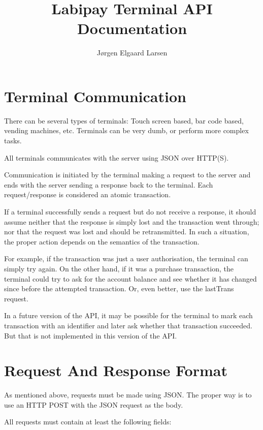 \documentclass[a4paper,11pt]{article}
\title{Labipay Terminal API Documentation}
\author{Jørgen Elgaard Larsen}
\newcommand{\code}[1]
   {\textsf{#1}}
\begin{document}
\maketitle

\section{Terminal Communication}
There can be several types of terminals: Touch screen based, bar code based,
vending machines, etc. Terminals can be very dumb, or perform more complex tasks. 

All terminals communicates with the server using JSON over HTTP(S). 

Communication is initiated by the terminal making a request to the
server and ends with the server sending a response back to the terminal. Each
request/response is considered an atomic transaction.

If a terminal successfully sends a request but do not receive a response, it
should assume neither that the response is simply lost and the transaction
went through; nor that the request was lost and should be
retransmitted. In such a situation, the proper action depends on the semantics
of the transaction.

For example, if the transaction was just a user authorisation, the terminal
can simply try again. On the other hand, if it was a purchase transaction, the
terminal could try to ask for the account balance and see whether it has
changed since before the attempted transaction. Or, even better, use
the \code{lastTrans} request.

In a future version of the API, it may be possible for the terminal to mark
each transaction with an identifier and later ask whether that transaction
succeeded. But that is not implemented in this version of the API.


\section{Request And Response Format}\label{sec:rrFormat}

As mentioned above, requests must be made using JSON. The proper way is to use
an HTTP POST with the JSON request as the body.

All requests must contain at least the following fields:
\end{document}
